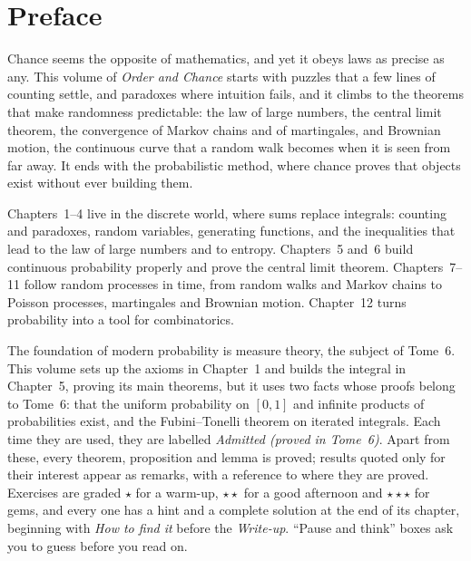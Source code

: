 \chapter*{Preface}
Chance seems the opposite of mathematics, and yet it obeys laws as precise as any. This volume of \emph{Order and
Chance} starts with puzzles that a few lines of counting settle, and paradoxes where intuition fails, and it climbs
to the theorems that make randomness predictable: the law of large numbers, the central limit theorem, the
convergence of Markov chains and of martingales, and Brownian motion, the continuous curve that a random walk
becomes when it is seen from far away. It ends with the probabilistic method, where chance proves that objects
exist without ever building them.

Chapters~1--4 live in the discrete world, where sums replace integrals: counting and paradoxes, random variables,
generating functions, and the inequalities that lead to the law of large numbers and to entropy. Chapters~5 and~6
build continuous probability properly and prove the central limit theorem. Chapters~7--11 follow random processes
in time, from random walks and Markov chains to Poisson processes, martingales and Brownian motion. Chapter~12
turns probability into a tool for combinatorics.

The foundation of modern probability is measure theory, the subject of Tome~6. This volume sets up the axioms in
Chapter~1 and builds the integral in Chapter~5, proving its main theorems, but it uses two facts whose proofs belong
to Tome~6: that the uniform probability on $[0,1]$ and infinite products of probabilities exist, and the
Fubini--Tonelli theorem on iterated integrals. Each time they are used, they are labelled \emph{Admitted (proved in
Tome~6)}. Apart from these, every theorem, proposition and lemma is proved; results quoted only for their interest appear as remarks, with a
reference to where they are proved. Exercises are graded \textbf{$\star$} for a warm-up, \textbf{$\star\star$} for a good
afternoon and \textbf{$\star\star\star$} for gems, and every one has a hint and a complete solution at the end of its
chapter, beginning with \emph{How to find it} before the \emph{Write-up}. ``Pause and think'' boxes ask you to guess
before you read on.
